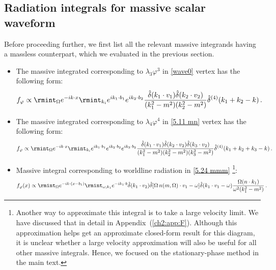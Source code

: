 \subsection*{Radiation integrals for massive scalar waveform}
Before proceeding further, we first list all the relevant massive integrands having a massless counterpart, which we evaluated in the previous section.
\begin{itemize}
  \item The massive integrated corresponding to $ \lambda_3 \varphi^3$ in \eqref{wave0} vertex has the following form:
    \begin{align}
        \begin{split}
          f_{\varphi}\propto \rmint_{\Omega}e^{-ik\cdot x}\rmint_{k_i}e^{ik_1\cdot b_1}e^{ik_2\cdot b_2}\frac{\hat\delta(k_1\cdot v_1)\hat\delta(k_2\cdot v_2)}{(k_1^2-m^2)(k_2^2-m^2)}\hat\delta^{(4)}(k_1+k_2-k)\,. \label{6.11 m}
        \end{split}
    \end{align}
\item The massive integrated corresponding to $\lambda_4 \varphi^4$ in \eqref{5.11 mn} vertex has the following form:
\begin{align} 
    \begin{split} \label{6.11 mm}
        f_{\varphi}\propto \rmint_{\Omega}e^{-ik\cdot x}\rmint_{k_i}e^{ik_1\cdot b_1}e^{i k_2\cdot b_2}e^{i k_3\cdot b_2}\frac{\hat\delta(k_1\cdot v_1)\hat\delta(k_2\cdot v_2)\hat\delta(k_3\cdot v_2)}{(k_1^2-m^2)(k_2^2 -m^2)(k_3^2-m^2)}\hat\delta^{(4)}(k_1+k_2+k_3-k)\,.
    \end{split} 
\end{align}
\item  
Massive integral corresponding to worldline radiation in \eqref{5.24 mmm} \footnote{Another way to approximate this integral is to take a large velocity limit. We have discussed that in detail in Appendix~(\ref{ch2:app:F}). Although this approximation helps get an approximate closed-form result for this diagram, it is unclear whether a large velocity approximation will also be useful for all other massive integrals. Hence, we focused on the stationary-phase method in the main text.}:
\begin{align}\label{6.4 mm}
f_{\varphi}(x)&\propto\rmint_{\Omega}e^{-ik\cdot (x-b_1)}\rmint_{\omega,k_1}e^{-i k_1\cdot b}\hat{\delta}(k_1\cdot v_2)\hat{\delta}[\Omega\, n(m,\Omega)\cdot v_1-\omega]\hat\delta(k_1\cdot v_1-\omega)\frac{\Omega(n\cdot k_1)}{\omega^2 (k_1^2-m^2)}\,.
\end{align}

\end{itemize}
